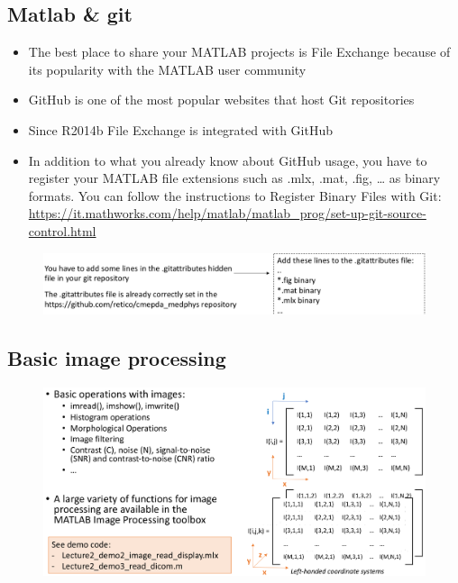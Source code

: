 \subsection{Matlab \& git}
\begin{itemize}
	\item The best place to share your MATLAB projects is File Exchange because of its popularity with the MATLAB user community
	\item GitHub is one of the most popular websites that host Git repositories
	\item Since R2014b File Exchange is integrated with GitHub
	\item In addition to what you already know about GitHub usage, you have to register
	your MATLAB file extensions such as .mlx, .mat, .fig, … as binary formats. You can
	follow the instructions to Register Binary Files with Git: \url{https://it.mathworks.com/help/matlab/matlab_prog/set-up-git-source-control.html}
\end{itemize}


\begin{figure}[ht]
	\centering
	\includegraphics[width=1\linewidth]{figure_med/matlab_git}
\end{figure}
\FloatBarrier

\newpage

\subsection{Basic image processing}


\begin{figure}[ht]
	\centering
	\includegraphics[width=1\linewidth]{figure_med/basic_img_processing}
\end{figure}
\FloatBarrier

